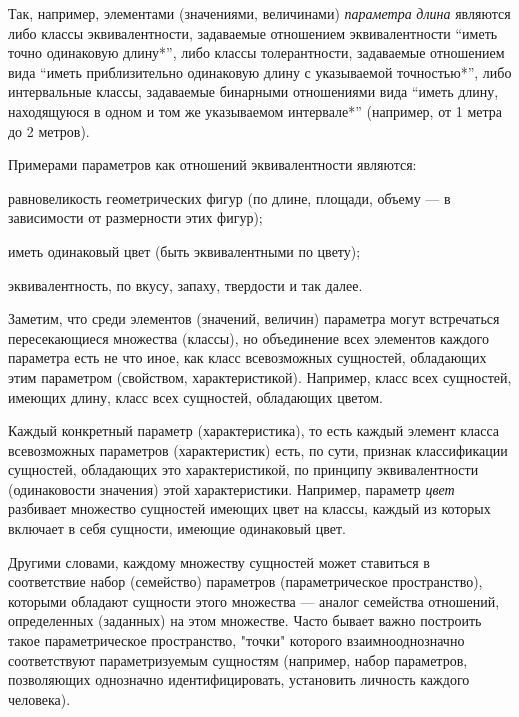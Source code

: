 Так, например, элементами (значениями, величинами) \textit{параметра} \textit{длина} являются либо классы эквивалентности, задаваемые отношением эквивалентности ``иметь точно одинаковую длину*'', либо классы толерантности, задаваемые отношением вида ``иметь приблизительно одинаковую длину с указываемой точностью*'', либо интервальные классы, задаваемые бинарными отношениями вида ``иметь длину, находящуюся в одном и том же указываемом интервале*'' (например, от 1 метра до 2 метров).

Примерами параметров как отношений эквивалентности являются:

\begin{textitemize}
	\item равновеликость геометрических фигур (по длине, площади, объему --- в зависимости от размерности этих фигур);
	\item иметь одинаковый цвет (быть эквивалентными по цвету);
	\item эквивалентность, по вкусу, запаху, твердости и так далее.
\end{textitemize}

Заметим, что среди элементов (значений, величин) параметра могут встречаться пересекающиеся множества (классы), но объединение всех элементов каждого параметра есть не что иное, как класс всевозможных сущностей, обладающих этим параметром (свойством, характеристикой). Например, класс всех сущностей, имеющих длину, класс всех сущностей, обладающих цветом.

\begin{SCn}
\begin{scnsubdividing}
\end{scnsubdividing}
\end{SCn}
		
Каждый конкретный параметр (характеристика), то есть каждый элемент класса всевозможных параметров (характеристик) есть, по сути, признак классификации сущностей, обладающих это характеристикой, по принципу эквивалентности (одинаковости значения) этой характеристики. Например, параметр \textit{цвет} разбивает множество сущностей имеющих цвет на классы, каждый из которых включает в себя сущности, имеющие одинаковый цвет.
		
Другими словами, каждому множеству сущностей может ставиться в соответствие набор (семейство) параметров (параметрическое пространство), которыми обладают сущности этого множества --- аналог семейства отношений, определенных (заданных) на этом множестве. Часто бывает важно построить такое параметрическое пространство, "точки"{} которого взаимнооднозначно соответствуют параметризуемым сущностям (например, набор параметров, позволяющих однозначно идентифицировать, установить личность каждого человека). 


